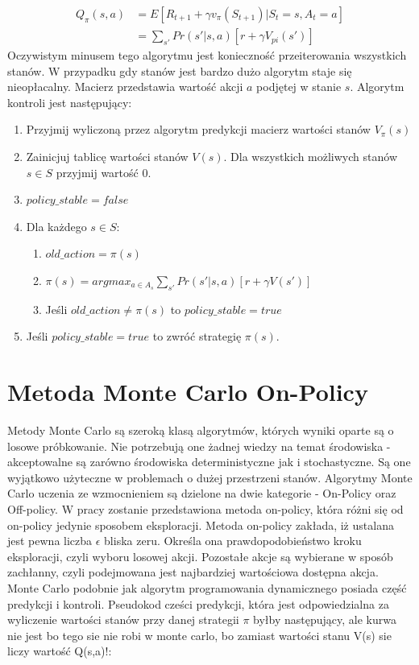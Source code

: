 \documentclass[12pt]{book}
\theoremstyle{plain}
\begin{document}
\begin{equation}
\begin{split}
Q_{\pi}(s,a) &= E[R_{t+1}+\gamma v_{\pi}(S_{t+1}) | S_t=s, A_t=a]  \\
           &= \sum_{s'}Pr(s'|s,a)[r+\gamma V_{pi}(s')] 
\end{split}
\end{equation}
Oczywistym minusem tego algorytmu jest konieczność przeiterowania wszystkich stanów. W przypadku gdy stanów jest bardzo dużo algorytm staje się nieopłacalny.
Macierz przedstawia wartość akcji $a$ podjętej w stanie $s$. Algorytm kontroli jest następujący:
\begin{enumerate}
\item{Przyjmij wyliczoną przez algorytm predykcji macierz wartości stanów $V_{\pi}(s)$}
\item{Zainicjuj tablicę wartości stanów $V(s)$. Dla wszystkich możliwych stanów $s \in S$ przyjmij wartość $0$.}
\item{$policy\_stable=false$}
\item{Dla każdego $s \in S$:}
  \begin{enumerate}
    \item $old\_action=\pi(s)$
    \item $\pi(s)=argmax_{a\in A_s} \sum_{s'}Pr(s'|s,a)[r+\gamma V(s')]$
    \item Jeśli $old\_action \neq \pi(s)$ to $policy\_stable = true$
  \end{enumerate}
\item Jeśli $policy\_stable=true$ to zwróć strategię $\pi(s)$.
\end{enumerate}
\section{Metoda Monte Carlo On-Policy}
Metody Monte Carlo są szeroką klasą algorytmów, których wyniki oparte są o losowe próbkowanie. Nie potrzebują one żadnej wiedzy na temat środowiska - akceptowalne są zarówno środowiska deterministyczne jak i stochastyczne. Są one wyjątkowo użyteczne w problemach o dużej przestrzeni stanów. Algorytmy Monte Carlo uczenia ze wzmocnieniem są dzielone na dwie kategorie - On-Policy oraz Off-policy. W pracy zostanie przedstawiona metoda on-policy, która różni się od on-policy jedynie sposobem eksploracji. Metoda on-policy zakłada, iż ustalana jest pewna liczba $\epsilon$ bliska zeru. Określa ona prawdopodobieństwo kroku eksploracji, czyli wyboru losowej akcji. Pozostałe akcje są wybierane w sposób zachłanny, czyli podejmowana jest najbardziej wartościowa dostępna akcja.
Monte Carlo podobnie jak algorytm programowania dynamicznego posiada część predykcji i kontroli. Pseudokod cześci predykcji, która jest odpowiedzialna za wyliczenie wartości stanów przy danej strategii $\pi$ byłby następujący, ale kurwa nie jest bo tego sie nie robi w monte carlo, bo zamiast wartości stanu V(s) sie liczy wartość Q(s,a)!:
\end{document}
